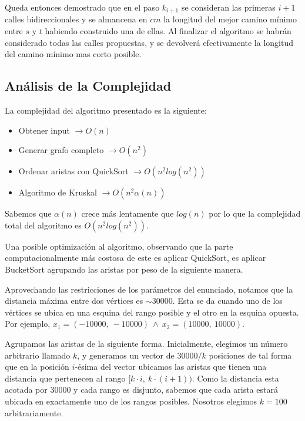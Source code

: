 \vspace{1em}

Queda entonces demostrado que en el paso $k_{i+1}$ se consideran las primeras $i+1$ calles bidireccionales y se almancena en $cm$ la longitud del mejor camino mínimo entre $s$ y $t$ habiendo construido una de ellas. Al finalizar el algoritmo se habrán considerado todas las calles propuestas, y se devolverá efectivamente la longitud del camino mínimo mas corto posible.

\subsection{Análisis de la Complejidad}
\vspace{1em}

La complejidad del algoritmo presentado es la siguiente: 

\begin{itemize}
    \item Obtener input \qquad \qquad \qquad \quad $\rightarrow O(n)$
    \item Generar grafo completo \qquad \quad $\rightarrow O(n^2)$
    \item Ordenar aristas con QuickSort $\rightarrow O(n^2 log(n^2))$
    \item Algoritmo de Kruskal \qquad \qquad $\rightarrow O(n^2 \alpha(n))$
\end{itemize}

Sabemos que $\alpha(n)$ crece más lentamente que $log(n)$ por lo que la complejidad total del algoritmo es $O(n^2 log(n^2))$.

\vspace{1em}

Una posible optimización al algoritmo, observando que la parte computacionalmente más costosa de este es aplicar QuickSort, es aplicar BucketSort agrupando las aristas por peso de la siguiente manera.

\vspace{1em}

Aprovechando las restricciones de los parámetros del enunciado, notamos que la distancia máxima entre dos vértices es $\sim30000$. Esta se da cuando uno de los vértices se ubica en una esquina del rango posible y el otro en la esquina opuesta. Por ejemplo, $x_1 = (-10000, \ -10000) \ \wedge \  x_2 = (10000, \ 10000)$.

\vspace{1em}

Agrupamos las aristas de la siguiente forma. Inicialmente, elegimos un número arbitrario llamado $k$, y generamos un vector de $30000 / k$ posiciones de tal forma que en la posición $i$-ésima del vector ubicamos las aristas que tienen una distancia que pertenecen al rango $[k \cdot i, \ k \cdot (i+1))$. Como la distancia esta acotada por 30000 y cada rango es disjunto, sabemos que cada arista estará ubicada en exactamente uno de los rangos posibles. Nosotros elegimos $k = 100$ arbitrariamente.

